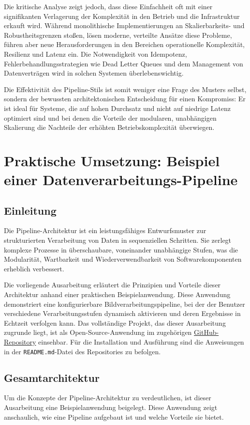 \documentclass[10pt,a4paper]{article}
\begin{document}
Die kritische Analyse zeigt jedoch, dass diese Einfachheit oft mit einer signifikanten Verlagerung der Komplexität in den Betrieb und die Infrastruktur erkauft wird. Während monolithische Implementierungen an Skalierbarkeits- und Robustheitsgrenzen stoßen, lösen moderne, verteilte Ansätze diese Probleme, führen aber neue Herausforderungen in den Bereichen operationelle Komplexität, Resilienz und Latenz ein. Die Notwendigkeit von Idempotenz, Fehlerbehandlungsstrategien wie Dead Letter Queues und dem Management von Datenverträgen wird in solchen Systemen überlebenswichtig.

Die Effektivität des Pipeline-Stils ist somit weniger eine Frage des Musters selbst, sondern der bewussten architektonischen Entscheidung für einen Kompromiss: Er ist ideal für Systeme, die auf hohen Durchsatz und nicht auf niedrige Latenz optimiert sind und bei denen die Vorteile der modularen, unabhängigen Skalierung die Nachteile der erhöhten Betriebskomplexität überwiegen.
\newpage

\section{Praktische Umsetzung: Beispiel einer Datenverarbeitungs-Pipeline}
\subsection{Einleitung}
Die Pipeline-Architektur ist ein leistungsfähiges Entwurfsmuster zur strukturierten Verarbeitung von Daten in sequenziellen Schritten. Sie zerlegt komplexe Prozesse in überschaubare, voneinander unabhängige Stufen, was die Modularität, Wartbarkeit und Wiederverwendbarkeit von Softwarekomponenten erheblich verbessert.

Die vorliegende Ausarbeitung erläutert die Prinzipien und Vorteile dieser Architektur anhand einer praktischen Beispielanwendung. Diese Anwendung demonstriert eine konfigurierbare Bildverarbeitungspipeline, bei der der Benutzer verschiedene Verarbeitungsstufen dynamisch aktivieren und deren Ergebnisse in Echtzeit verfolgen kann. Das vollständige Projekt, das dieser Ausarbeitung zugrunde liegt, ist als Open-Source-Anwendung im zugehörigen \hyperlink{https://github.com/Jonas-Alber/SWA-Project.git}{GitHub-Repository} einsehbar. Für die Installation und Ausführung sind die Anweisungen in der \texttt{README.md}-Datei des Repositories zu befolgen.


\subsection{Gesamtarchitektur}
Um die Konzepte der Pipeline-Architektur zu verdeutlichen, ist dieser Ausarbeitung eine Beispielanwendung beigelegt. Diese Anwendung zeigt anschaulich, wie eine Pipeline aufgebaut ist und welche Vorteile sie bietet.
\end{document}
